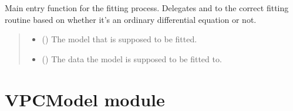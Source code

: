 \documentclass[letterpaper,10pt,english]{sphinxmanual}
\begin{document}
\begin{fulllineitems}
\label{\detokenize{ModelFitter:src.ModelFitter.fit}}
\pysigstartsignatures
{}
\pysigstopsignatures
\sphinxAtStartPar
Main entry function for the fitting process. Delegates  and  to the correct
fitting routine based on whether it’s an ordinary differential equation or not.
\begin{quote}\begin{description}
\begin{itemize}
\item {} 
\sphinxAtStartPar
{} ({\hyperref[\detokenize{VPCModel:src.VPCModel.VPCModel}]{}}) \textendash{} The model that is supposed to be fitted.

\item {} 
\sphinxAtStartPar
{} (\sphinxstyleliteralemphasis{\sphinxupquote{{[}}}\sphinxstyleliteralemphasis{\sphinxupquote{{[}}}\sphinxstyleliteralemphasis{\sphinxupquote{  |  }}\sphinxstyleliteralemphasis{\sphinxupquote{{]}}}\sphinxstyleliteralemphasis{\sphinxupquote{{]}}}) \textendash{} The data the model is supposed to be fitted to.

\end{itemize}

\end{description}\end{quote}

\end{fulllineitems}


\sphinxstepscope


\chapter{VPCModel module}
\label{\detokenize{VPCModel:module-src.VPCModel}}\label{\detokenize{VPCModel:vpcmodel-module}}\label{\detokenize{VPCModel::doc}}
\end{document}
